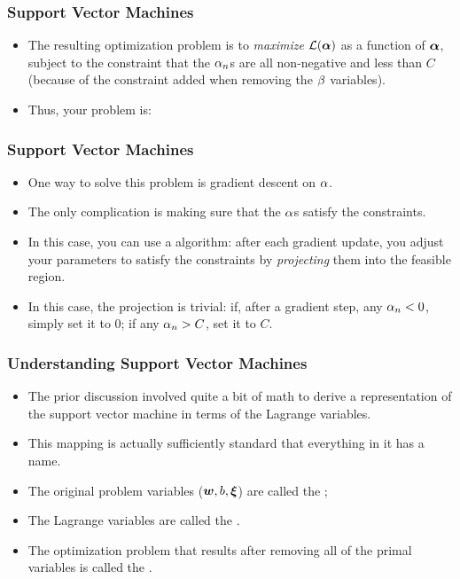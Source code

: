 \documentclass[trans]{beamer}
\begin{document}
\begin{frame}
  \frametitle{Support Vector Machines}
\begin{itemize}
\item 
The resulting optimization problem is to \emph{maximize}
$\mathcal{L}(\boldsymbol{\alpha})$ as a function of $\boldsymbol{\alpha}$, subject to the constraint
that the $\alpha_n$s are all non-negative and less than $C$ (because of
the constraint added when removing the $\beta$ variables).  
\item Thus, your
problem is:
%
%
\end{itemize}
\end{frame}

\begin{frame}
  \frametitle{Support Vector Machines}
\begin{itemize}
\item 
One way to solve this problem is gradient descent on $\alpha$.  
\item The only
complication is making sure that the $\alpha$s satisfy the constraints.
\item In this case, you can use a  algorithm:
after each gradient update, you adjust your parameters to satisfy the
constraints by \emph{projecting} them into the feasible region. 
\item In
this case, the projection is trivial: if, after a gradient step, any
$\alpha_n < 0$, simply set it to $0$; if any $\alpha_n > C$, set it to $C$.
\end{itemize}
\end{frame}

\begin{frame}
  \frametitle{Understanding Support Vector Machines}
\begin{itemize}
\item 
The prior discussion involved quite a bit of math to derive a
representation of the support vector machine in terms of the Lagrange
variables.
\item  This mapping is actually sufficiently standard that
everything in it has a name. 
\item The original problem variables
(${\boldsymbol{w}},b,\boldsymbol{\xi}$) are called the ; 
\item The
Lagrange variables are called the . 
\item The
optimization problem that results after removing all of the primal
variables is called the .
\end{itemize}
\end{frame}
\end{document}
